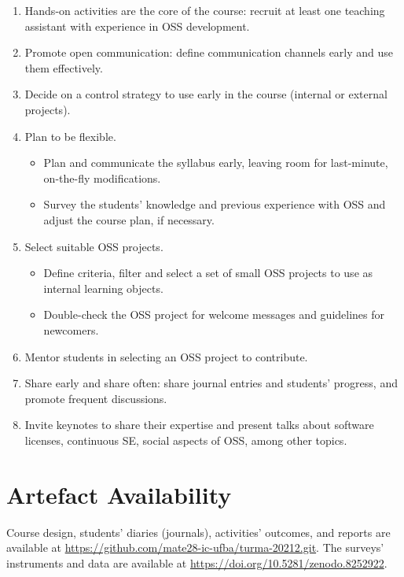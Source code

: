 \documentclass[sigconf]{acmart}
\begin{document}
\begin{enumerate}
\item Hands-on activities are the core of the course: recruit at least one teaching assistant with experience in OSS development.
\item Promote open communication: define communication channels early and use them effectively.
\item Decide on a control strategy to use early in the course (internal or external projects).
\item Plan to be flexible. 
\begin{itemize}
    \item Plan and communicate the syllabus early, leaving room for last-minute, on-the-fly modifications.
    \item Survey the students' knowledge and previous experience with OSS and adjust the course plan, if necessary.
\end{itemize}
\item Select suitable OSS projects.
\begin{itemize}
    \item Define criteria, filter and select a set of small OSS projects to use as internal learning objects.
    \item Double-check the OSS project for welcome messages and guidelines for newcomers.
\end{itemize}
\item Mentor students in selecting an OSS project to contribute.
\item Share early and share often: share journal entries and students' progress, and promote frequent discussions.
\item Invite keynotes to share their expertise and present talks about software licenses, continuous SE, social aspects of OSS, among other topics.
\end{enumerate}


\section*{Artefact Availability}

Course design, students' diaries (journals), activities' outcomes, and reports are available at \url{https://github.com/mate28-ic-ufba/turma-20212.git}. 
The surveys' instruments and data are available at \url{https://doi.org/10.5281/zenodo.8252922}.
\end{document}
